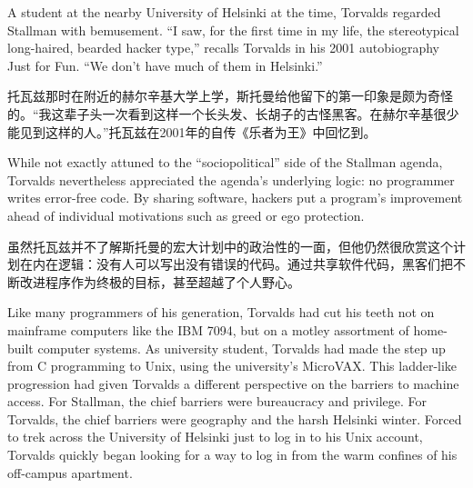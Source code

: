 \ifdefined\eng
A student at the nearby University of Helsinki at the time, Torvalds regarded Stallman with bemusement. ``I saw, for the first time in my life, the stereotypical long-haired, bearded hacker type,'' recalls Torvalds in his 2001 autobiography Just for Fun. ``We don't have much of them in Helsinki.''
\fi

\ifdefined\chs
托瓦兹那时在附近的赫尔辛基大学上学，斯托曼给他留下的第一印象是颇为奇怪的。``我这辈子头一次看到这样一个长头发、长胡子的古怪黑客。在赫尔辛基很少能见到这样的人。''托瓦兹在2001年的自传《乐者为王》中回忆到。
\fi

\ifdefined\eng
While not exactly attuned to the ``sociopolitical'' side of the Stallman agenda, Torvalds nevertheless appreciated the agenda's underlying logic: no programmer writes error-free code. By sharing software, hackers put a program's improvement ahead of individual motivations such as greed or ego protection.
\fi

\ifdefined\chs
虽然托瓦兹并不了解斯托曼的宏大计划中的政治性的一面，但他仍然很欣赏这个计划在内在逻辑：没有人可以写出没有错误的代码。通过共享软件代码，黑客们把不断改进程序作为终极的目标，甚至超越了个人野心。
\fi

\ifdefined\eng
Like many programmers of his generation, Torvalds had cut his teeth not on mainframe computers like the IBM 7094, but on a motley assortment of home-built computer systems. As university student, Torvalds had made the step up from C programming to Unix, using the university's MicroVAX. This ladder-like progression had given Torvalds a different perspective on the barriers to machine access. For Stallman, the chief barriers were bureaucracy and privilege. For Torvalds, the chief barriers were geography and the harsh Helsinki winter. Forced to trek across the University of Helsinki just to log in to his Unix account, Torvalds quickly began looking for a way to log in from the warm confines of his off-campus apartment.
\fi

